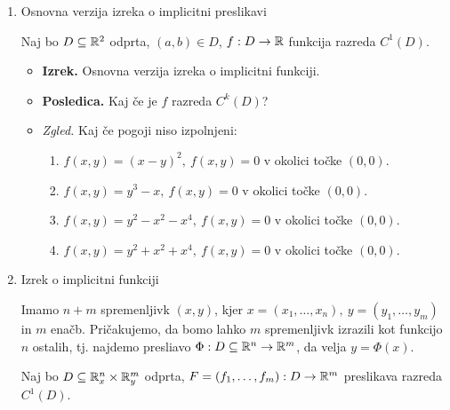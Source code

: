 \begin{enumerate}
    \item Osnovna verzija izreka o implicitni preslikavi
    
    Naj bo $D \subseteq \mathbb{R}^2$ odprta, $(a, b) \in D$, $f: D \to \mathbb{R}$ funkcija razreda $C^1(D)$.
    \begin{itemize}
        \item \colorbox{blue!30}{\textbf{Izrek.}} Osnovna verzija izreka o implicitni funkciji.
        \item \colorbox{orange!30}{\textbf{Posledica.}} Kaj če je $f$ razreda $C^k(D)$?
        \item \colorbox{yellow!30}{\emph{Zgled.}} Kaj če pogoji niso izpolnjeni:
        \begin{enumerate}
            \item $f(x,y) = (x-y)^2, \ f(x,y) = 0$ v okolici točke $(0,0)$.
            \item $f(x,y) = y^3-x, \ f(x,y) = 0$ v okolici točke $(0,0)$.
            \item $f(x,y) = y^2-x^2-x^4, \ f(x,y) = 0$ v okolici točke $(0,0)$.
            \item $f(x,y) = y^2+x^2+x^4,  \ f(x,y) = 0$ v okolici točke $(0,0)$.
        \end{enumerate}
    \end{itemize}

    \item Izrek o implicitni funkciji
    
    Imamo $n+m$ spremenljivk $(x,y)$, kjer $x = (x_1, \ldots, x_n), \ y = (y_1, \ldots, y_m)$ in $m$ enačb. Pričakujemo, da bomo lahko $m$ spremenljivk izrazili kot funkcijo $n$ ostalih, tj. najdemo presliavo $\Phi: D \subseteq \mathbb{R}^n \to \mathbb{R}^m$, da velja $y = \Phi(x)$.

    Naj bo $D \subseteq \mathbb{R}^n_x \times \mathbb{R}^m_y$ odprta, $F = (f_1, \ldots, f_m): D \to \mathbb{R}^m$ preslikava razreda $C^1(D)$.


\end{enumerate}
